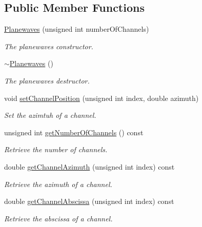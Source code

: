 \subsection*{Public Member Functions}
\begin{DoxyCompactItemize}
\item 
\hyperlink{class_hoa2_d_1_1_planewaves_ab233faf82900c5695b926214d6bbfff6}{Planewaves} (unsigned int number\-Of\-Channels)
\begin{DoxyCompactList}\small\item\em The planewaves constructor. \end{DoxyCompactList}\item 
\hyperlink{class_hoa2_d_1_1_planewaves_a7d13cc39051ae75f2af522651a1305bf}{$\sim$\-Planewaves} ()
\begin{DoxyCompactList}\small\item\em The planewaves destructor. \end{DoxyCompactList}\item 
void \hyperlink{class_hoa2_d_1_1_planewaves_a6f6dfb5355b12915c658ac8967303ef4}{set\-Channel\-Position} (unsigned int index, double azimuth)
\begin{DoxyCompactList}\small\item\em Set the azimtuh of a channel. \end{DoxyCompactList}\item 
unsigned int \hyperlink{class_hoa2_d_1_1_planewaves_a4bf0de6ae4ac7ac03fc552d477237a85}{get\-Number\-Of\-Channels} () const 
\begin{DoxyCompactList}\small\item\em Retrieve the number of channels. \end{DoxyCompactList}\item 
double \hyperlink{class_hoa2_d_1_1_planewaves_a52c4f8b05137ab56e82b0e076d7f5d3a}{get\-Channel\-Azimuth} (unsigned int index) const 
\begin{DoxyCompactList}\small\item\em Retrieve the azimuth of a channel. \end{DoxyCompactList}\item 
double \hyperlink{class_hoa2_d_1_1_planewaves_aab20597fa76482d7a907b2e39cc5be25}{get\-Channel\-Abscissa} (unsigned int index) const 
\begin{DoxyCompactList}\small\item\em Retrieve the abscissa of a channel. \end{DoxyCompactList}\item 

\end{DoxyCompactItemize}

